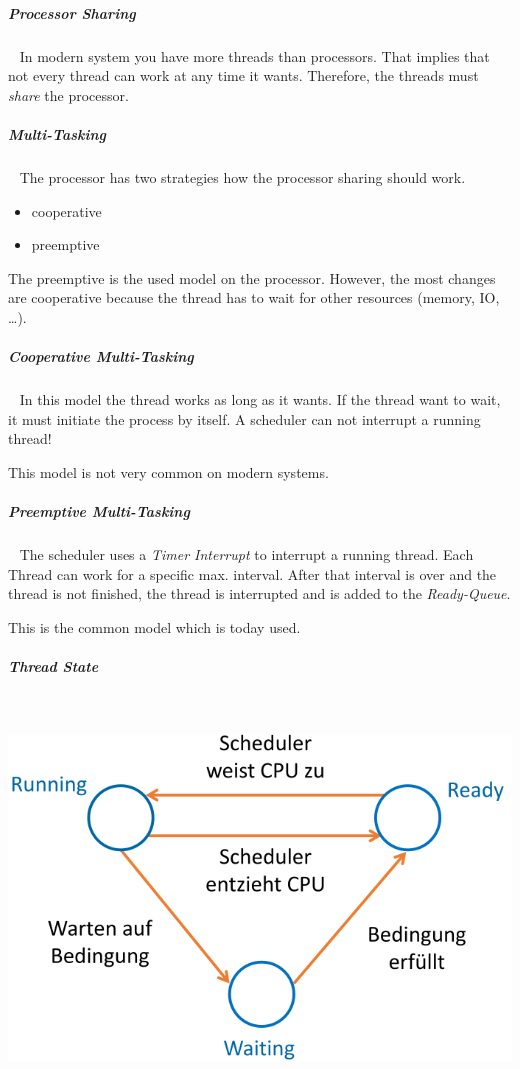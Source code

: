 \documentclass[11pt,twoside,landscape]{article}
\begin{document}
\begin{multicols}{3}
\subparagraph{Processor Sharing} \
\label{sec:org20cff44}
In modern system you have more threads than processors.
That implies that not every thread can work at any time it wants.
Therefore, the threads must \emph{share} the processor.

\subparagraph{Multi-Tasking} \
\label{sec:org9d795e2}
The processor has two strategies how the processor sharing should work.
\begin{itemize}
\item cooperative
\item preemptive
\end{itemize}

The preemptive is the used model on the processor.
However, the most changes are cooperative because the thread has to wait for other resources (memory, IO, \ldots{}). 

\subparagraph{Cooperative Multi-Tasking} \
\label{sec:orge059019}
In this model the thread works as long as it wants.
If the thread want to wait, it must initiate the process by itself.
A scheduler can not interrupt a running thread!

This model is not very common on modern systems.

\subparagraph{Preemptive Multi-Tasking} \
\label{sec:orge738f93}
The scheduler uses a \emph{Timer Interrupt} to interrupt a running thread.
Each Thread can work for a specific max. interval.
After that interval is over and the thread is not finished, the thread is interrupted and is added to the \emph{Ready-Queue}.

This is the common model which is today used.

\subparagraph{Thread State} \
\label{sec:orge818242}

{
\begin{center}
\includegraphics[width=.9\linewidth]{img/thread_states.png}
\end{center}
\label{fig:thread-states}
}


\end{multicols}
\end{document}
